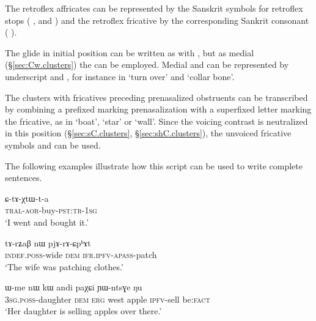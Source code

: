 The retroflex affricates can be represented by the Sanskrit symbols for retroflex stops ( ,   and  ) and the retroflex fricative by the corresponding Sankrit consonant (  ).


The glide  in initial position can be written as   with , but as medial (§\ref{sec:Cw.clusters}) the  can be employed. Medial  and  can be represented by underscript  and , for instance in  `turn over' and  `collar bone'.

The clusters with fricatives preceding prenasalized obstruents can be transcribed by combining a prefixed {} marking prenasalization with a superfixed letter marking the fricative, as in  `boat',   `star' or  `wall'. Since the voicing contrast is neutralized in this position (§\ref{sec:sC.clusters}, §\ref{sec:shC.clusters}), the unvoiced fricative symbols  and  can be used.

The following examples illustrate how this script can be used to write complete sentences. 

\begin{exe}
	\ex 
	\gll ɕ-tɤ-χtɯ-t-a \\
	\textsc{tral}-\textsc{aor}-buy-\textsc{pst}:\textsc{tr}-\textsc{1sg} \\
	\glt {} 
	\glt `I went and bought it.' 
\end{exe}

\begin{exe}
	\ex 
	\gll  tɤ-rʑaβ nɯ pjɤ-rɤ-ɕpʰɤt \\
	\textsc{indef}.\textsc{poss}-wide \textsc{dem} \textsc{ifr}.\textsc{ipfv}-\textsc{apass}-patch \\
	\glt {}
	\glt `The wife was patching clothes.' 
\end{exe}


\begin{exe}
	\ex 
	\gll  ɯ-me nɯ kɯ andi paχɕi ɲɯ-ntsɣe ŋu\\
	\textsc{3sg}.\textsc{poss}-daughter \textsc{dem} \textsc{erg} west apple \textsc{ipfv}-sell be:\textsc{fact} \\
	\glt {}
	\glt `Her daughter is selling apples over there.' 
\end{exe}

